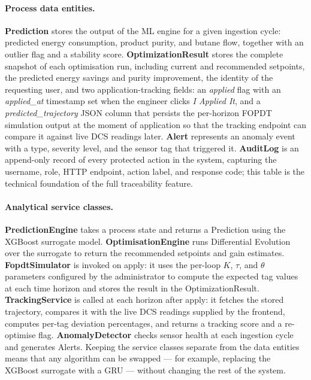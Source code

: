 \paragraph{Process data entities.}
\textbf{Prediction} stores the output of the ML engine for a given
ingestion cycle: predicted energy consumption, product purity, and
butane flow, together with an outlier flag and a stability score.
\textbf{OptimizationResult} stores the complete snapshot of each
optimisation run, including current and recommended setpoints, the
predicted energy savings and purity improvement, the identity of the
requesting user, and two application-tracking fields: an
\textit{applied} flag with an \textit{applied\_at} timestamp set
when the engineer clicks \textit{I Applied It}, and a
\textit{predicted\_trajectory} JSON column that persists the
per-horizon FOPDT simulation output at the moment of application so
that the tracking endpoint can compare it against live DCS readings
later.  \textbf{Alert} represents an anomaly event with a type,
severity level, and the sensor tag that triggered it.
\textbf{AuditLog} is an append-only record of every protected action
in the system, capturing the username, role, HTTP endpoint, action
label, and response code; this table is the technical foundation of
the full traceability feature.

\paragraph{Analytical service classes.}
\textbf{PredictionEngine} takes a process state and returns a
Prediction using the XGBoost surrogate model.
\textbf{OptimisationEngine} runs Differential Evolution over the
surrogate to return the recommended setpoints and gain estimates.
\textbf{FopdtSimulator} is invoked on apply: it uses the per-loop
$K$, $\tau$, and $\theta$ parameters configured by the administrator
to compute the expected tag values at each time horizon and stores
the result in the OptimizationResult.
\textbf{TrackingService} is called at each horizon after apply: it
fetches the stored trajectory, compares it with the live DCS
readings supplied by the frontend, computes per-tag deviation
percentages, and returns a tracking score and a re-optimise flag.
\textbf{AnomalyDetector} checks sensor health at each ingestion
cycle and generates Alerts.  Keeping the service classes separate
from the data entities means that any algorithm can be swapped ---
for example, replacing the XGBoost surrogate with a GRU --- without
changing the rest of the system.

